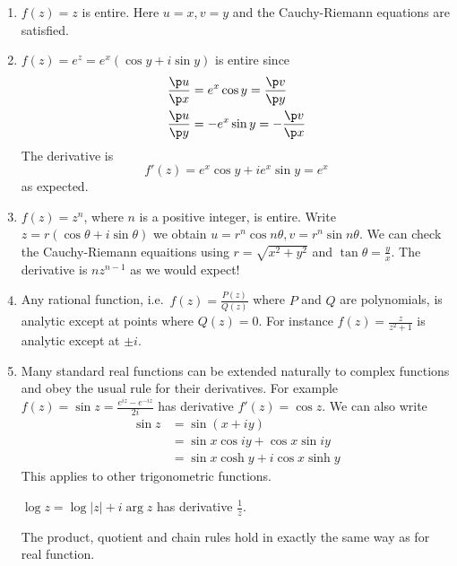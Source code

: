 \documentclass[a4paper]{article}
\begin{document}
\begin{eg}\leavevmode
  \begin{enumerate}
  \item \(f(z) = z\) is entire. Here \(u = x, v = y\) and the Cauchy-Riemann equations are satisfied.
  \item \(f(z) = e^z = e^x(\cos y + i \sin y)\) is entire since
    \begin{align*}
      \frac{\p u}{\p x} &= e^x \cos y = \frac{\p v}{\p y} \\
      \frac{\p u}{\p y} &= -e^x \sin y = -\frac{\p v}{\p x}
    \end{align*}
    The derivative is
    \[
      f'(z) = e^x \cos y + ie^x \sin y = e^x
    \]
    as expected.
  \item \(f(z) = z^n\), where \(n\) is a positive integer, is entire. Write \(z = r(\cos \theta + i \sin \theta)\) we obtain \(u = r^n \cos n\theta, v = r^n \sin n\theta\). We can check the Cauchy-Riemann equaitions using \(r = \sqrt{x^2 + y^2}\) and \(\tan \theta = \frac{y}{x}\). The derivative is \(nz^{n - 1}\) as we would expect!
  \item Any rational function, i.e.\ \(f(z) = \frac{P(z)}{Q(z)}\) where \(P\) and \(Q\) are polynomials, is analytic except at points where \(Q(z) = 0\). For instance \(f(z) = \frac{z}{z^2 + 1}\) is analytic except at \(\pm i\).
  \item Many standard real functions can be extended naturally to complex functions and obey the usual rule for their derivatives. For example \(f(z) = \sin z = \frac{e^{iz} - e^{-iz}}{2i}\) has derivative \(f'(z) = \cos z\). We can also write
    \begin{align*}
      \sin z &= \sin (x + iy) \\
             &= \sin x \cos iy + \cos x \sin iy \\
             &= \sin x \cosh y + i \cos x \sinh y
    \end{align*}
    This applies to other trigonometric functions.

    \(\log z = \log |z| + i \arg z\) has derivative \(\frac{1}{z}\).

    The product, quotient and chain rules hold in exactly the same way as for real function.
  \end{enumerate}
\end{eg}
\end{document}
